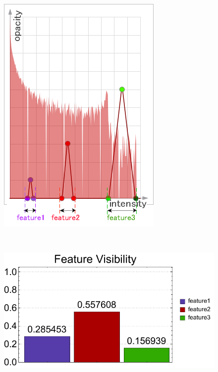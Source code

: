 \begin{figure}
\begin{minipage}{.15\textwidth}
	\includegraphics[width=1\linewidth]{figures/tf_nucleon_naive_proportional}
	\subcaption{}
\end{minipage}~
\begin{minipage}{.29\textwidth}
	\includegraphics[width=1\linewidth]{figures/nucleon_naive_proportional_visibility_chart}

\end{minipage}
\end{figure}
